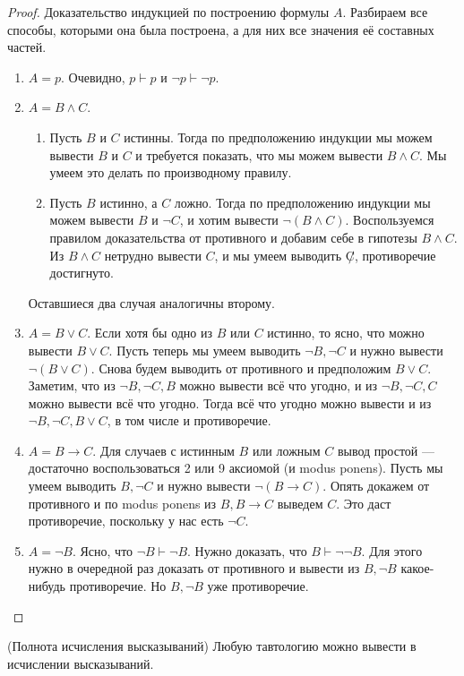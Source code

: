 \documentclass{article}
\begin{document}
\begin{proof}
	Доказательство индукцией по построению формулы $A$. Разбираем все способы, которыми она была построена, а для них все значения её составных частей.
	\begin{enumerate}
		\item $A = p$. Очевидно, $p \vdash p$ и $\lnot p \vdash \lnot p$.
		\item $A = B \land C$. 
		\begin{enumerate}
			\item Пусть $B$ и $C$ истинны. Тогда по предположению индукции мы можем вывести $B$ и $C$ и требуется показать, что мы можем вывести $B \land C$. Мы умеем это делать по производному правилу.
			\item Пусть $B$ истинно, а $C$ ложно. Тогда по предположению индукции мы можем вывести $B$ и $\lnot C$, и хотим вывести $\lnot(B \land C)$. Воспользуемся правилом доказательства от противного и добавим себе в гипотезы $B \land C$. Из $B \land C$ нетрудно вывести $C$, и мы умеем выводить $\not C$, противоречие достигнуто.
		\end{enumerate}
		Оставшиеся два случая аналогичны второму.
		\item $A = B \lor C$. Если хотя бы одно из $B$ или $C$ истинно, то ясно, что можно вывести $B \lor C$. Пусть теперь мы умеем выводить $\lnot B, \lnot C$ и нужно вывести $\lnot (B \lor C)$. Снова будем выводить от противного и предположим $B \lor C$. Заметим, что из $\lnot B, \lnot C, B$ можно вывести всё что угодно, и из $\lnot B, \lnot C, C$ можно вывести всё что угодно. Тогда всё что угодно можно вывести и из $\lnot B, \lnot C, B \lor C$, в том числе и противоречие.
		\item $A = B \to C$. Для случаев с истинным $B$ или ложным $C$ вывод простой --- достаточно воспользоваться 2 или 9 аксиомой (и modus ponens). Пусть мы умеем выводить $B, \lnot C$ и нужно вывести $\lnot(B \to C)$. Опять докажем от противного и по modus ponens из $B, B \to C$ выведем $C$. Это даст противоречие, поскольку у нас есть $\lnot C$.
		\item $A = \lnot B$. Ясно, что $\lnot B \vdash \lnot B$. Нужно доказать, что $B \vdash \lnot \lnot B$. Для этого нужно в очередной раз доказать от противного и вывести из $B, \lnot B$ какое-нибудь противоречие. Но $B, \lnot B$ уже противоречие.
	\end{enumerate}
\end{proof}

\begin{theorem}{(Полнота исчисления высказываний)}
	Любую тавтологию можно вывести в исчислении высказываний.
\end{theorem}
\end{document}
